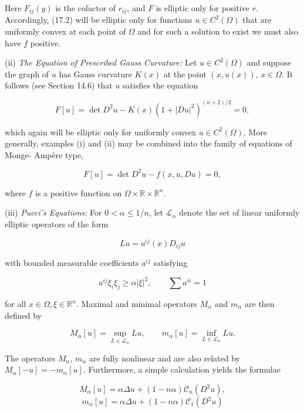 
Here $F_{ij}(y)$ is the cofactor of $r_{ij}$, and $F$ is elliptic only for positive $r$. Accordingly,
(17.2) will be elliptic only for functions $u \in C^2(\Omega)$ that are uniformly convex at each
point of $\Omega$ and for such a solution to exist we must also have $f$ positive.

(ii) \emph{The Equation of Prescribed Gauss Curvature:} Let $u \in C^2(\Omega)$ and suppose the
graph of $u$ has Gauss curvature $K(x)$ at the point $(x,u(x))$, $x \in \Omega$. It follows (see
Section 14.6) that $u$ satisfies the equation

\begin{equation}
F[u] = \det D^2 u - K(x)(1 + |Du|^2)^{(n+2)/2} = 0,
\tag{17.3}
\end{equation}

which again will be elliptic only for uniformly convex $u \in C^2(\Omega)$. More generally,
examples (i) and (ii) may be combined into the family of equations of Monge-
Ampère type,

\begin{equation}
F[u] = \det D^2 u - f(x,u,Du) = 0,
\tag{17.4}
\end{equation}

where $f$ is a positive function on $\Omega \times \mathbb{R} \times \mathbb{R}^n$.

(iii) \emph{Pucci's Equations:} For $0 < \alpha \leq 1/n$, let $\mathcal{L}_\alpha$ denote the set of linear uniformly
elliptic operators of the form

\[
Lu = a^{ij}(x)D_{ij}u
\]

with bounded measurable coefficients $a^{ij}$ satisfying

\[
a^{ij}\xi_i \xi_j \geq \alpha |\xi|^2,\qquad \sum a^{ii} = 1
\]

for all $x \in \Omega, \xi \in \mathbb{R}^n$. Maximal and minimal operators $M_\alpha$ and $m_\alpha$ are then defined by

\begin{equation}
M_\alpha[u] = \sup_{L \in \mathcal{L}_\alpha} Lu,\qquad m_\alpha[u] = \inf_{L \in \mathcal{L}_\alpha} Lu.
\tag{17.5}
\end{equation}

The operators $M_\alpha$, $m_\alpha$ are fully nonlinear and are also related by $M_\alpha[-u] =
-m_\alpha[u]$. Furthermore, a simple calculation yields the formulae

\[
M_\alpha[u] = \alpha \Delta u + (1 - n\alpha)\mathcal{C}_n(D^2u),
\]
\[
m_\alpha[u] = \alpha \Delta u + (1 - n\alpha)\mathcal{C}_1(D^2u)
\]

